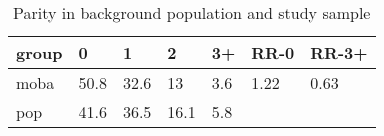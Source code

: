 \begin{table}[ht]
\centering
\begin{tabular}{lllllll}
  \hline
group & 0 & 1 & 2 & 3+ & RR-0 & RR-3+ \\ 
  \hline
moba & 50.8 & 32.6 & 13 & 3.6 & 1.22 & 0.63 \\ 
  pop & 41.6 & 36.5 & 16.1 & 5.8 &  &  \\ 
   \hline
\end{tabular}
\caption{Parity in background population and study sample} 
\label{table:parity}
\end{table}
